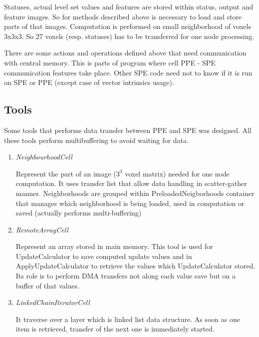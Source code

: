 
\par
Statuses, actual level set values and features are stored within status, output and feature images.
So for methods described above is necessary to load and store parts of that images.
Computation is performed on small neighborhood of voxels 3x3x3.
So 27 voxels (resp. statuses) has to be transferred for one node processing.

\par
There are some actions and operations defined above that need communication with central memory.
This is parts of program where cell PPE - SPE communication features take place.
Other SPE code need not to know if it is run on SPE or PPE (except case of vector intrinsics usage).

\subsection{Tools}
Some tools that performs data transfer between PPE and SPE was designed.
All these tools perform multibuffering to avoid waiting for data.

\begin{enumerate}
\item \emph{NeighbourhoodCell}
\par
Represent the part of an image ($3^3$ voxel matrix) needed for one node computation.
It uses transfer list that allow data handling in scatter-gather manner.
Neighborhoods are grouped within PreloadedNeigborhoods container that manages which neighborhood is being loaded, used in computation or saved (actually performs multi-buffering)

\item \emph{RemoteArrayCell}
\par
Represent an array stored in main memory.
This tool is used for UpdateCalculator to save computed update values and in ApplyUpdateCalculator to retrieve the values which UpdateCalculator stored.
Its role is to perform DMA transfers not along each value save but on a buffer of that values.

\item \emph{LinkedChainIteratorCell}
\par
It traverse over a layer which is linked list data structure.
As soon as one item is retrieved, transfer of the next one is immediately started.
\end{enumerate}

